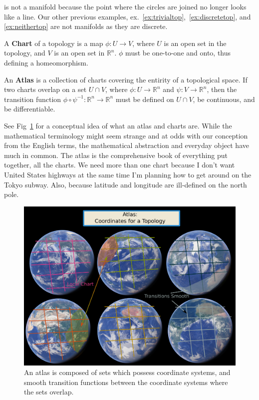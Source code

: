 \begin{center}
\end{center}

  is not a manifold because the point where the circles are joined no longer looks like a line.  Our other previous examples, ex.~\ref{ex:trivialtop},~\ref{ex:discretetop}, and \ref{ex:neithertop} are not manifolds as they are discrete.

\begin{definition}
  A \textbf{Chart} of a topology is a map $\phi: U \rightarrow V$, where $U$ is an open set in the topology, and $V$ is an open set in $\mathbb{R}^n$.   $\phi$ must be one-to-one and onto, thus defining a homeomorphism.
\end{definition}

\begin{definition}[Atlas]
  An \textbf{Atlas} is a collection of charts covering the entirity of a topological space.  If two charts overlap on a set $U \cap V$, where $\phi:U\rightarrow \mathbb{R}^n$ and $\psi:V\rightarrow \mathbb{R}^n$, then the transition function $\phi \circ \psi^{-1}: \mathbb{R}^n \rightarrow \mathbb{R}^n$ must be defined on $U\cap V$, be continuous, and be differentiable.
\end{definition}

See Fig~\ref{fig:atlas} for a conceptual idea of what an atlas and charts are.  While the mathematical terminology might seem strange and at odds with our conception from the English terms, the mathematical abstraction and everyday object have much in common.  The atlas is the comprehensive book of everything put together, all the charts.  We need more than one chart because I don't want United States highways at the same time I'm planning how to get around on the Tokyo subway.  Also, because latitude and longitude are ill-defined on the north pole.


\begin{figure}
  \includegraphics[width=\textwidth]{pics/atlas.png}
  \caption{An atlas is composed of sets which possess coordinate systems, and smooth transition functions between the coordinate systems where the sets overlap.}
    \label{fig:atlas}
\end{figure}
